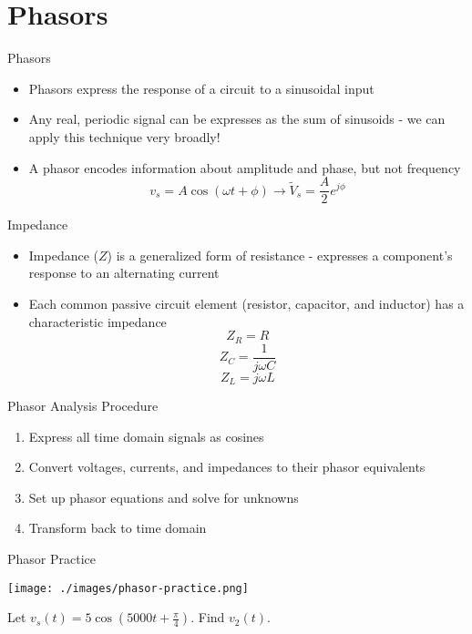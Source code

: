 
\section{Phasors}
	
    \begin{frame}{Phasors}
        \begin{itemize}
            \item Phasors express the response of a circuit to a sinusoidal input
            \item Any real, periodic signal can be expresses as the sum of sinusoids - we can apply this technique very broadly!
            \item A phasor encodes information about amplitude and phase, but not frequency
            $$v_s=A\cos(\omega t+\phi) \rightarrow \tilde{V}_s=\frac{A}{2}e^{j\phi}$$
        \end{itemize}
    \end{frame}
    
    \begin{frame}{Impedance}
        \begin{itemize}
            \item Impedance ($Z$) is a generalized form of resistance - expresses a component's response to an alternating current
            \item Each common passive circuit element (resistor, capacitor, and inductor) has a characteristic impedance
            $$Z_R=R$$
            $$Z_C=\frac{1}{j\omega C}$$
            $$Z_L=j\omega L$$
        \end{itemize}
    \end{frame}
    
    \begin{frame}{Phasor Analysis Procedure}
        \begin{enumerate}
            \item Express all time domain signals as cosines
            \item Convert voltages, currents, and impedances to their phasor equivalents
            \item Set up phasor equations and solve for unknowns
            \item Transform back to time domain
        \end{enumerate}
    \end{frame}
    
    \begin{frame}{Phasor Practice}
        \begin{center}
            \texttt{[image: ./images/phasor-practice.png]}
        \end{center}
        Let $v_s(t)=5\cos(5000t+\frac{\pi}{4})$. Find $v_2(t)$.
    \end{frame}

